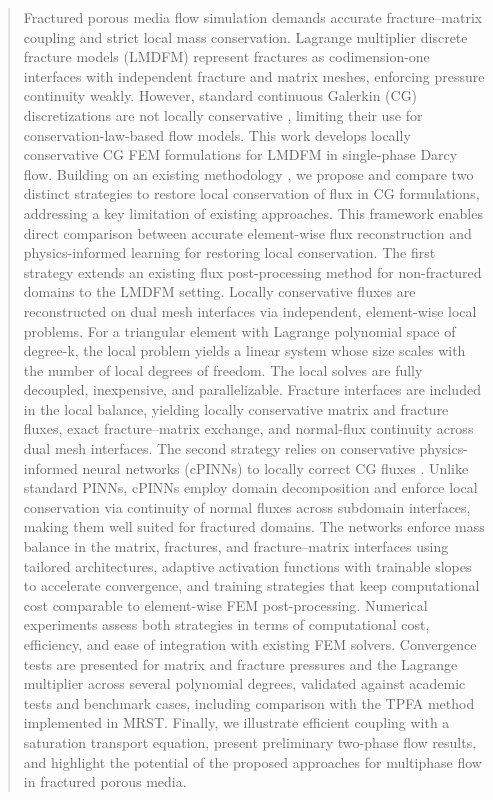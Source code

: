 \documentclass[a4paper,fleqn]{cas-sc}
\begin{document}
\begin{abstract}
Fractured porous media flow simulation demands accurate fracture--matrix coupling and strict local mass conservation. Lagrange multiplier discrete fracture models (LMDFM) represent fractures as codimension-one interfaces with independent fracture and matrix meshes, enforcing pressure continuity weakly. However, standard continuous Galerkin (CG) discretizations are not locally conservative \citep{Koeppel2019}, limiting their use for conservation-law-based flow models. This work develops locally conservative CG FEM formulations for LMDFM in single-phase Darcy flow. Building on an existing methodology \citep{Koeppel2019}, we propose and compare two distinct strategies to restore local conservation of flux in CG formulations, addressing a key limitation of existing approaches. This framework enables direct comparison between accurate element-wise flux reconstruction and physics-informed learning for restoring local conservation. The first strategy extends an existing flux post-processing method for non-fractured domains \citep{DENG2019166} to the LMDFM setting. Locally conservative fluxes are reconstructed on dual mesh interfaces via independent, element-wise local problems. For a triangular element with Lagrange polynomial space of degree-k, the local problem yields a linear system whose size scales with the number of local degrees of freedom. The local solves are fully decoupled, inexpensive, and parallelizable. Fracture interfaces are included in the local balance, yielding locally conservative matrix and fracture fluxes, exact fracture--matrix exchange, and normal-flux continuity across dual mesh interfaces. The second strategy relies on conservative physics-informed neural networks (cPINNs) to locally correct CG fluxes \citep{Jagtap2020}. Unlike standard PINNs, cPINNs employ domain decomposition and enforce local conservation via continuity of normal fluxes across subdomain interfaces, making them well suited for fractured domains. The networks enforce mass balance in the matrix, fractures, and fracture--matrix interfaces using tailored architectures, adaptive activation functions with trainable slopes to accelerate convergence, and training strategies that keep computational cost comparable to element-wise FEM post-processing. Numerical experiments assess both strategies in terms of computational cost, efficiency, and ease of integration with existing FEM solvers. Convergence tests are presented for matrix and fracture pressures and the Lagrange multiplier across several polynomial degrees, validated against academic tests and benchmark cases, including comparison with the TPFA method implemented in MRST. Finally, we illustrate efficient coupling with a saturation transport equation, present preliminary two-phase flow results, and highlight the potential of the proposed approaches for multiphase flow in fractured porous media.
\end{abstract}
\end{document}
